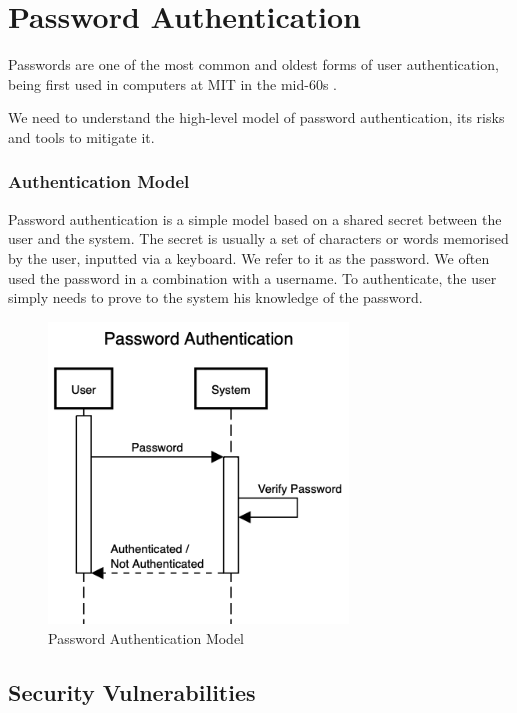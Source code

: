 \section{Password Authentication}
\label{section:password-authentication}

Passwords are one of the most common and oldest forms of user authentication, being first used in computers at MIT in the mid-60s \cite{mcmillan2012password}.

We need to understand the high-level model of password authentication, its risks and tools to mitigate it.

\subsubsection{Authentication Model}

Password authentication is a simple model based on a shared secret between the user and the system. The secret is usually a set of characters or words memorised by the user, inputted via a keyboard. We refer to it as the password.
We often used the password in a combination with a username.
To authenticate, the user simply needs to prove to the system his knowledge of the password.


\begin{figure}[h]
	\centering
	\includegraphics[height=8cm]{images/password-authentication}
	\caption{Password Authentication Model}
	\label{fig:password-authentication}
\end{figure}

\subsection{Security Vulnerabilities}
\label{label:password-vulnerabilities}

